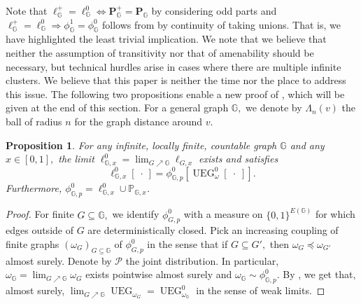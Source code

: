\documentclass[article,11pt,reqno]{amsart}
\newtheorem{proposition}[theorem]{Proposition}
\begin{document}
\begin{appendix}
Note that  $\ell_\mathbb{G}^+=\ell_\mathbb{G}^0\Longleftrightarrow \mathbf{P}_\mathbb{G}^+=\mathbf{P}_\mathbb{G}$ by considering odd parts and $\ell^+_{\mathbb{G}}=\ell^0_{\mathbb{G}}\Longrightarrow \phi^1_{\mathbb{G}}=\phi^0_{\mathbb{G}}$ follows from  by continuity of taking unions. That is, we have highlighted the least trivial implication.  We note that we believe that neither the assumption of transitivity nor that of amenability should be necessary, but technical hurdles arise in cases where there are multiple infinite clusters. We believe that this paper is neither the time nor the place to address this issue.
The following two propositions enable a new proof of , which will be given at the end of this section.
For a general graph $\mathbb{G},$ we denote by $\Lambda_n(v)$ the ball of radius $n$ for the graph distance around $v$.
\begin{proposition}\label{prop:general_loop_O(1)_thermodynamic_limit}
For any infinite, locally finite, countable graph $\mathbb{G}$ and any $x\in [0,1],$ the limit 
$
\ell^0_{\mathbb{G},x}=\lim_{G\nearrow \mathbb{G}}\ell_{G,x}
$ exists and satisfies
$$
\ell^0_{\mathbb{G},x}[\;\cdot\,]=\phi_{\mathbb{G},p}^0[\operatorname{UEG}^0_\omega[\;\cdot\;]].
$$
Furthermore, $\phi^0_{\mathbb{G},p}=\ell^0_{\mathbb{G},x}\cup \mathbb{P}_{\mathbb{G},x}$.
\end{proposition}
\begin{proof}
For finite $G\subseteq \mathbb{G},$ we identify $\phi^0_{G,p}$ with a measure on $\{0,1\}^{E(\mathbb{G})}$ for which edges outside of $G$ are deterministically closed. Pick an increasing coupling of finite graphs $(\omega_G)_{G\subseteq \mathbb{G}}$ of $\phi^0_{G,p}$ in the sense that if $G\subseteq G',$ then $\omega_G\preceq \omega_{G'}$ almost surely. Denote by $\mathcal{P}$ the joint distribution. In particular, $\omega_{\mathbb{G}}=\lim_{G\nearrow \mathbb{G}}\omega_G$ exists pointwise almost surely and $\omega_{\mathbb{G}}\sim \phi^0_{\mathbb{G},p}.$ By \cite[Theorem 3.10]{hansen2023uniform}, we get that, almost surely, $\lim_{G\nearrow \mathbb{G}}\operatorname{UEG}_{\omega_G}=\operatorname{UEG}^0_{\omega_{\mathbb{G}}}$ in the sense of weak limits. 


\end{proof}
\end{appendix}
\end{document}
